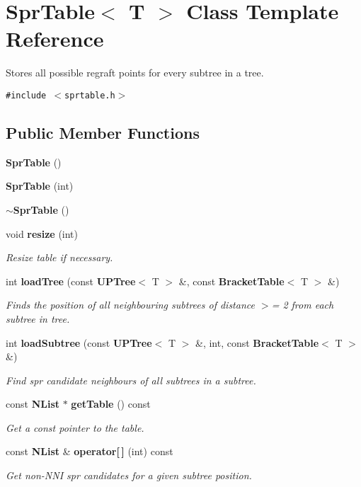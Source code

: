 \section{Spr\-Table$<$ T $>$ Class Template Reference}
\label{classSprTable}
Stores all possible regraft points for every subtree in a tree.  


{\tt \#include $<$sprtable.h$>$}

\subsection*{Public Member Functions}
\begin{CompactItemize}
\item 
{\bf Spr\-Table} ()
\item 
{\bf Spr\-Table} (int)
\item 
{\bf $\sim$Spr\-Table} ()
\item 
void {\bf resize} (int)
\begin{CompactList}\small\item\em Resize table if necessary. \item\end{CompactList}\item 
int {\bf load\-Tree} (const {\bf UPTree}$<$ T $>$ \&, const {\bf Bracket\-Table}$<$ T $>$ \&)
\begin{CompactList}\small\item\em Finds the position of all neighbouring subtrees of distance $>$= 2 from each subtree in tree. \item\end{CompactList}\item 
int {\bf load\-Subtree} (const {\bf UPTree}$<$ T $>$ \&, int, const {\bf Bracket\-Table}$<$ T $>$ \&)
\begin{CompactList}\small\item\em Find spr candidate neighbours of all subtrees in a subtree. \item\end{CompactList}\item 
const {\bf NList} $\ast$ {\bf get\-Table} () const 
\begin{CompactList}\small\item\em Get a const pointer to the table. \item\end{CompactList}\item 
const {\bf NList} \& {\bf operator[$\,$]} (int) const 
\begin{CompactList}\small\item\em Get non-NNI spr candidates for a given subtree position. \item\end{CompactList}\end{CompactItemize}

